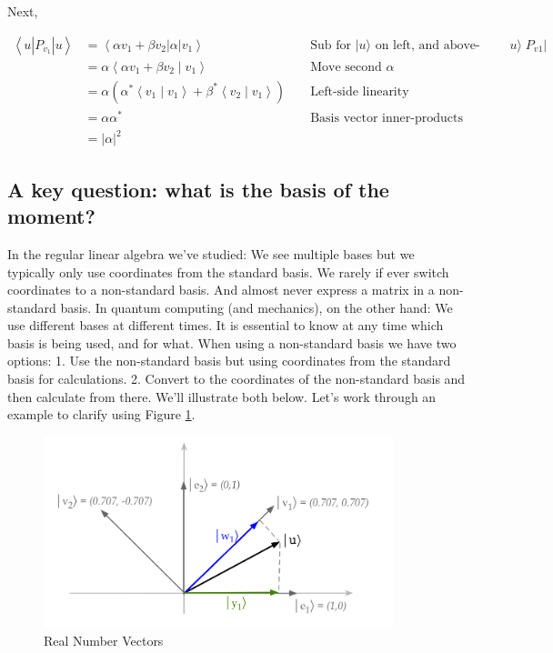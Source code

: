 \documentclass[main.tex]{subfiles}
\begin{document}
    Next,
    
    $$
    \begin{aligned}
    \left\langle u\left|P_{v_{1}}\right| u\right\rangle &=\left\langle\alpha v_{1}+\beta v_{2}|\alpha| v_{1}\right\rangle & & \text { Sub for }|u\rangle \text { on left, and above-computed } P_{v 1}|u\rangle \\
    &=\alpha\left\langle\alpha v_{1}+\beta v_{2} \mid v_{1}\right\rangle & & \text { Move second } \alpha \\
    &=\alpha\left(\alpha^{*}\left\langle v_{1} \mid v_{1}\right\rangle+\beta^{*}\left\langle v_{2} \mid v_{1}\right\rangle\right) & & \text { Left-side linearity } \\
    &=\alpha \alpha^{*} & & \text { Basis vector inner-products } \\
    &     =|\alpha|^{2} & &
    \end{aligned}
    $$

\subsection{A key question: what is the basis of the moment?}

    In the regular linear algebra we've studied: We see multiple bases but we typically only use coordinates from the standard basis. We rarely if ever switch coordinates to a non-standard basis. And almost never express a matrix in a non-standard basis. In quantum computing (and mechanics), on the other hand: We use different bases at different times. It is essential to know at any time which basis is being used, and for what. When using a non-standard basis we have two options: 1. Use the non-standard basis but using coordinates from the standard basis for calculations. 2. Convert to the coordinates of the non-standard basis and then calculate from there. We'll illustrate both below. Let's work through an example to clarify using Figure \ref{fig:18basischange.png}.
    
    \begin{figure}
        \centering
        \includegraphics[width=4in]{notes/figs/n04/18basischange.png}
        \caption{Real Number Vectors}
        \label{fig:18basischange.png}
    \end{figure}
    
\end{document}
